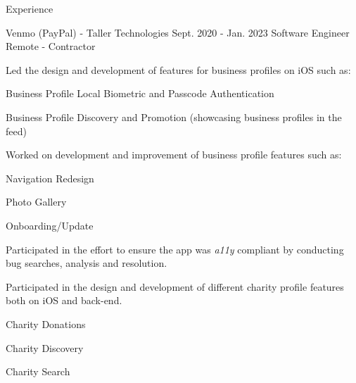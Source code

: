 \documentclass{curriculum}
\begin{document}
\begin{cvsection}{Experience}


    \makesectionitemheader
        {Venmo (PayPal) - Taller Technologies}              {Sept. 2020 - Jan. 2023}
        {Software Engineer}                                 {Remote - Contractor}

        \begin{sectionitemlist}

        \item{
            Led the design and development of features for business profiles on iOS such as:
        }{
            \begin{colsectionitemlist}{2}
            \item{Business Profile Local Biometric and Passcode Authentication}
            \item{Business Profile Discovery and Promotion (showcasing business profiles in the feed)}
            \end{colsectionitemlist}
        }

        \item{
            Worked on development and improvement of business profile features such as:
        }{
            \begin{colsectionitemlist}{2}
            \item{Navigation Redesign}
            \item{Photo Gallery}
            \item{Onboarding/Update}
            \end{colsectionitemlist}
        }

        \item{
            Participated in the effort to ensure the app was \textit{a11y} compliant
            by conducting bug searches, analysis and resolution.
        }

        \item{
            Participated in the design and development of
            different charity profile features both on iOS and back-end.
        }{
            \begin{colsectionitemlist}{3}
            \item{Charity Donations}
            \item{Charity Discovery}
            \item{Charity Search}
            \end{colsectionitemlist}
        }


\end{sectionitemlist}
\end{cvsection}
\end{document}
